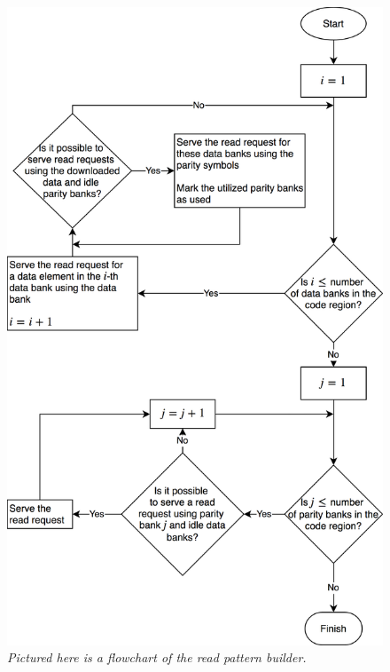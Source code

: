 
\begin{figure}[t!]
	\includegraphics[width=0.96\linewidth]{fig/read_pattern_algo.png}
	\caption{{\it{Pictured here is a flowchart of the read pattern builder.}}}
	\label{fig:readAlgo}
\end{figure}
